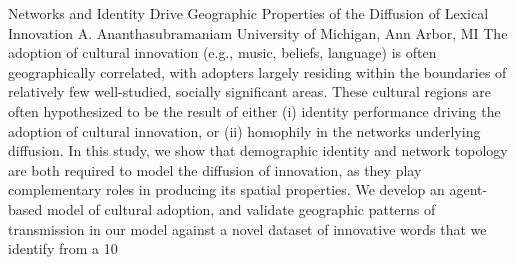 
    \begin{abstract_online}{Networks and Identity Drive Geographic Properties of the Diffusion of Lexical Innovation}{%
        A. Ananthasubramaniam}{%
        }{%
        University of Michigan, Ann Arbor, MI}
    The adoption of cultural innovation (e.g., music, beliefs, language) is often geographically correlated, with adopters largely residing within the boundaries of relatively few well-studied, socially significant areas. These cultural regions are often hypothesized to be the result of either (i) identity performance driving the adoption of cultural innovation, or (ii) homophily in the networks underlying diffusion. In this study, we show that demographic identity and network topology are both required to model the diffusion of innovation, as they play complementary roles in producing its spatial properties. We develop an agent-based model of cultural adoption, and validate geographic patterns of transmission in our model against a novel dataset of innovative words that we identify from a 10%
    
    \end{abstract_online}
    